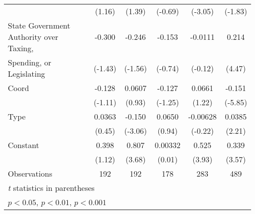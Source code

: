 \begin{table}[htbp]
\begin{tabular}{l*{5}{c}}
                                        &   (1.16)         &   (1.39)         &  (-0.69)         &  (-3.05)         &  (-1.83)         \\
\addlinespace
State Government Authority over Taxing, &   -0.300         &   -0.246         &   -0.153         &  -0.0111         &    0.214\sym{***}\\
Spending, or Legislating                &  (-1.43)         &  (-1.56)         &  (-0.74)         &  (-0.12)         &   (4.47)         \\
\addlinespace
Coord                                   &   -0.128         &   0.0607         &   -0.127         &   0.0661         &   -0.151\sym{***}\\
                                        &  (-1.11)         &   (0.93)         &  (-1.25)         &   (1.22)         &  (-5.85)         \\
\addlinespace
Type                                    &   0.0363         &   -0.150\sym{**} &   0.0650         & -0.00628         &   0.0385\sym{*}  \\
                                        &   (0.45)         &  (-3.06)         &   (0.94)         &  (-0.22)         &   (2.21)         \\
\addlinespace
Constant                                &    0.398         &    0.807\sym{***}&  0.00332         &    0.525\sym{***}&    0.339\sym{***}\\
                                        &   (1.12)         &   (3.68)         &   (0.01)         &   (3.93)         &   (3.57)         \\
\midrule
Observations                            &      192         &      192         &      178         &      283         &      489         \\
\bottomrule
\multicolumn{6}{l}{\footnotesize \textit{t} statistics in parentheses}\\
\multicolumn{6}{l}{\footnotesize \sym{*} \(p<0.05\), \sym{**} \(p<0.01\), \sym{***} \(p<0.001\)}\\
\end{tabular}
\end{table}
